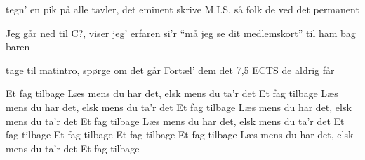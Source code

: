 \documentclass[a4paper,11pt]{article}
\begin{document}
\begin{song}
tegn’ en pik på alle tavler, det eminent
skrive M.I.S, så folk de ved det permanent

Jeg går ned til C?, viser jeg’ erfaren
si’r “må jeg se dit medlemskort” til ham bag baren

tage til matintro, spørge om det går
Fortæl’ dem det 7,5 ECTS de aldrig får

%
Et fag tilbage
Læs mens du har det, elsk mens du ta’r det
Et fag tilbage
Læs mens du har det, elsk mens du ta’r det
Et fag tilbage
Læs mens du har det, elsk mens du ta’r det
Et fag tilbage
Læs mens du har det, elsk mens du ta’r det
Et fag tilbage
Et fag tilbage
Et fag tilbage
Et fag tilbage
Læs mens du har det, elsk mens du ta’r det
Et fag tilbage
\end{song}
\end{document}
